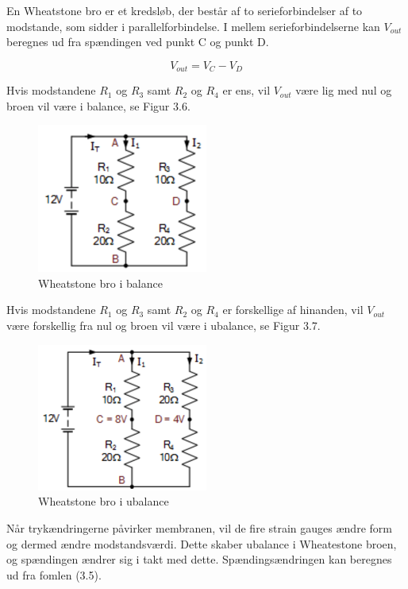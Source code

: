 En Wheatstone bro er et kredsløb, der består af to serieforbindelser af to modstande, som sidder i parallelforbindelse. I mellem serieforbindelserne kan $V_{out}$ beregnes ud fra spændingen ved punkt C og punkt D.

\begin{equation}
	V_{out} = V_{C} - V_{D}
\end{equation} 

Hvis modstandene $R_{1}$ og $R_{3}$ samt $R_{2}$ og $R_{4}$ er ens, vil $V_{out}$ være lig med nul og broen vil være i balance, se Figur 3.6. 

\begin{figure}[H]
	\centering
	\includegraphics[width=0.5\textwidth]{Figurer/Snip20151207_64}
	\caption{Wheatstone bro i balance}
\end{figure}

Hvis modstandene $R_{1}$ og $R_{3}$ samt $R_{2}$ og $R_{4}$ er forskellige af hinanden, vil $V_{out}$ være forskellig fra nul og broen vil være i ubalance, se Figur 3.7. 

\begin{figure}[H]
	\centering
	\includegraphics[width=0.5\textwidth]{Figurer/Snip20151207_65}
	\caption{Wheatstone bro i ubalance}
\end{figure}

Når trykændringerne påvirker membranen, vil de fire strain gauges ændre form og dermed ændre modstandsværdi. Dette skaber ubalance i Wheatestone broen, og spændingen ændrer sig i takt med dette. Spændingsændringen kan beregnes ud fra fomlen (3.5).


